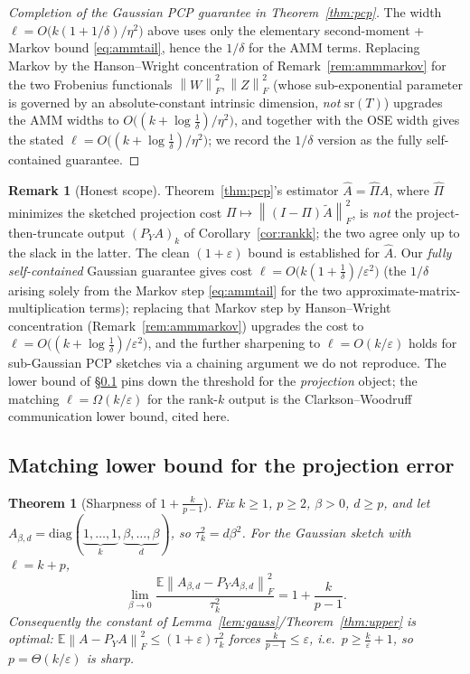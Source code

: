 \documentclass{amsart}
\newtheorem{theorem}{Theorem}
\theoremstyle{definition}
\newtheorem{remark}{Remark}
\newcommand{\Frob}[1]{\left\lVert #1\right\rVert_F}
\newcommand{\Atil}{\widetilde{A}}
\newcommand{\E}{\mathbb{E}}
\begin{document}
\begin{proof}[Completion of the Gaussian PCP guarantee in Theorem~\ref{thm:pcp}]
\smallskip
The width $\ell=O\big(k(1+1/\delta)/\eta^2\big)$ above uses only the elementary
second-moment + Markov bound \eqref{eq:ammtail}, hence the $1/\delta$ for the AMM
terms. Replacing Markov by the Hanson--Wright concentration of
Remark~\ref{rem:ammmarkov} for the two Frobenius functionals $\Frob W^2,\Frob Z^2$
(whose sub-exponential parameter is governed by an absolute-constant intrinsic
dimension, \emph{not} $\mathrm{sr}(T)$) upgrades the AMM widths to
$O\big((k+\log\tfrac1\delta)/\eta^2\big)$, and together with the OSE width
gives the stated
$\ell=O\big((k+\log\tfrac1\delta)/\eta^2\big)$; we record the $1/\delta$ version
as the fully self-contained guarantee.
\end{proof}

\begin{remark}[Honest scope]\label{rem:scope}
Theorem~\ref{thm:pcp}'s estimator $\widehat A=\widehat\Pi A$, where $\widehat\Pi$
minimizes the sketched projection cost $\Pi\mapsto\Frob{(I-\Pi)\Atil}^2$, is
\emph{not} the project-then-truncate output $(P_YA)_k$ of
Corollary~\ref{cor:rankk}; the two agree only up to the slack in the latter. The
clean $(1+\varepsilon)$ bound is established for $\widehat A$. Our
\emph{fully self-contained} Gaussian guarantee gives cost
$\ell=O\big(k(1+\tfrac1\delta)/\varepsilon^2\big)$ (the $1/\delta$ arising solely
from the Markov step \eqref{eq:ammtail} for the two approximate-matrix-
multiplication terms); replacing that Markov step by Hanson--Wright
concentration (Remark~\ref{rem:ammmarkov}) upgrades the cost to
$\ell=O\big((k+\log\tfrac1\delta)/\varepsilon^2\big)$, and the further sharpening
to $\ell=O(k/\varepsilon)$ holds for sub-Gaussian PCP sketches via a chaining
argument we do not reproduce. The lower bound of \S\ref{sec:lower} pins down the
threshold for the \emph{projection} object; the matching $\ell=\Omega(k/\varepsilon)$
for the rank-$k$ output is the Clarkson--Woodruff communication lower bound,
cited here.
\end{remark}

\subsection{Matching lower bound for the projection error}\label{sec:lower}

\begin{theorem}[Sharpness of $1+\tfrac{k}{p-1}$]\label{thm:lower}
Fix $k\ge1$, $p\ge2$, $\beta>0$, $d\ge p$, and let
$A_{\beta,d}=\mathrm{diag}(\underbrace{1,\dots,1}_{k},\underbrace{\beta,\dots,\beta}_{d})$,
so $\tau_k^2=d\beta^2$. For the Gaussian sketch with $\ell=k+p$,
\begin{equation}\label{eq:limit}
\lim_{\beta\to0}\frac{\E\Frob{A_{\beta,d}-P_YA_{\beta,d}}^2}{\tau_k^2}
=1+\frac{k}{p-1}.
\end{equation}
Consequently the constant of Lemma~\ref{lem:gauss}/Theorem~\ref{thm:upper} is
optimal: $\E\Frob{A-P_YA}^2\le(1+\varepsilon)\tau_k^2$ forces
$\frac{k}{p-1}\le\varepsilon$, i.e.\ $p\ge\frac k\varepsilon+1$, so
$p=\Theta(k/\varepsilon)$ is sharp.
\end{theorem}
\end{document}
